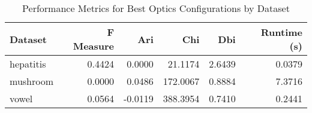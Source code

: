 \begin{table*}[ht!]
\caption{Performance Metrics for Best Optics Configurations by Dataset}
\label{tab:best_configs_optics_performance}
\begin{tabular}{lrrrrr}
Dataset & F Measure & Ari & Chi & Dbi & Runtime (s) \\\midrule

hepatitis & 0.4424 & 0.0000 & 21.1174 & 2.6439 & 0.0379 \\
mushroom & 0.0000 & 0.0486 & 172.0067 & 0.8884 & 7.3716 \\
vowel & 0.0564 & -0.0119 & 388.3954 & 0.7410 & 0.2441 \\
\end{tabular}
\end{table*}
